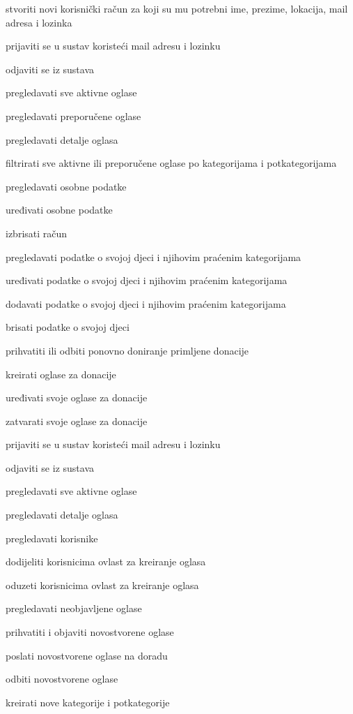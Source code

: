 \begin{packed_enum}
				\begin{packed_enum}
					\item stvoriti novi korisnički račun za koji su mu potrebni ime, prezime, lokacija, mail adresa i lozinka
					\item prijaviti se u sustav koristeći mail adresu i lozinku
					\item odjaviti se iz sustava
					\item pregledavati sve aktivne oglase
					\item pregledavati preporučene oglase
					\item pregledavati detalje oglasa
					\item filtrirati sve aktivne ili preporučene oglase po kategorijama i potkategorijama
					\item pregledavati osobne podatke
					\item uređivati osobne podatke
					\item izbrisati račun
					\item pregledavati podatke o svojoj djeci i njihovim praćenim kategorijama
					\item uređivati podatke o svojoj djeci i njihovim praćenim kategorijama
					\item dodavati podatke o svojoj djeci i njihovim praćenim kategorijama
					\item brisati podatke o svojoj djeci
					\item prihvatiti ili odbiti ponovno doniranje primljene donacije
					\item kreirati oglase za donacije
					\item uređivati svoje oglase za donacije 
					\item zatvarati svoje oglase za donacije
					
				\end{packed_enum}

				\item  {}
				
				\begin{packed_enum}
					\item prijaviti se u sustav koristeći mail adresu i lozinku
					\item odjaviti se iz sustava
					\item pregledavati sve aktivne oglase
					\item pregledavati detalje oglasa
					\item pregledavati korisnike
					\item dodijeliti korisnicima ovlast za kreiranje oglasa
					\item oduzeti korisnicima ovlast za kreiranje oglasa
					\item pregledavati neobjavljene oglase
					\item prihvatiti i objaviti novostvorene oglase
					\item poslati novostvorene oglase na doradu
					\item odbiti novostvorene oglase
					\item kreirati nove kategorije i potkategorije
					

\end{packed_enum}
\end{packed_enum}
